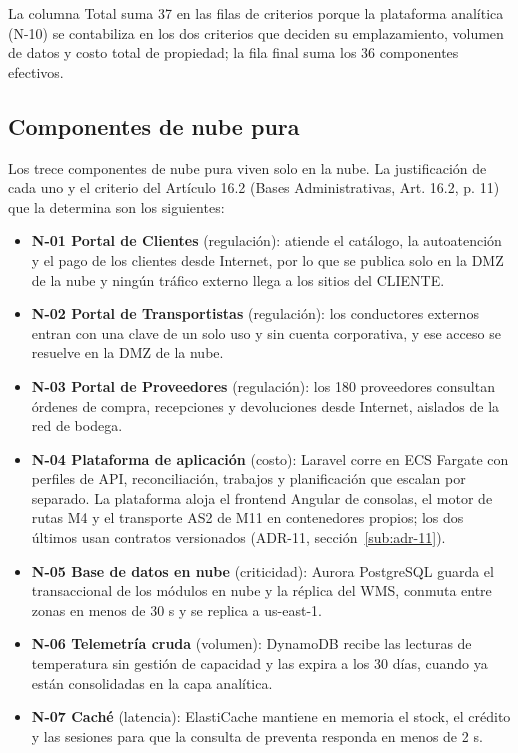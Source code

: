 La columna Total suma 37 en las filas de criterios porque la plataforma analítica (N-10) se contabiliza en los dos criterios que deciden su emplazamiento, volumen de datos y costo total de propiedad; la fila final suma los 36 componentes efectivos.

\subsection{Componentes de nube pura}

Los trece componentes de nube pura viven solo en la nube. La justificación de cada uno y el criterio del Artículo 16.2 (Bases Administrativas, Art. 16.2, p. 11) que la determina son los siguientes:

\begin{itemize}
  \item \textbf{N-01 Portal de Clientes} (regulación): atiende el catálogo, la autoatención y el pago de los clientes desde Internet, por lo que se publica solo en la DMZ de la nube y ningún tráfico externo llega a los sitios del CLIENTE.
  \item \textbf{N-02 Portal de Transportistas} (regulación): los conductores externos entran con una clave de un solo uso y sin cuenta corporativa, y ese acceso se resuelve en la DMZ de la nube.
  \item \textbf{N-03 Portal de Proveedores} (regulación): los 180 proveedores consultan órdenes de compra, recepciones y devoluciones desde Internet, aislados de la red de bodega.
  \item \textbf{N-04 Plataforma de aplicación} (costo): Laravel corre en ECS Fargate con perfiles de API, reconciliación, trabajos y planificación que escalan por separado. La plataforma aloja el frontend Angular de consolas, el motor de rutas M4 y el transporte AS2 de M11 en contenedores propios; los dos últimos usan contratos versionados (ADR-11, sección~\ref{sub:adr-11}).
  \item \textbf{N-05 Base de datos en nube} (criticidad): Aurora PostgreSQL guarda el transaccional de los módulos en nube y la réplica del WMS, conmuta entre zonas en menos de 30 s y se replica a us-east-1.
  \item \textbf{N-06 Telemetría cruda} (volumen): DynamoDB recibe las lecturas de temperatura sin gestión de capacidad y las expira a los 30 días, cuando ya están consolidadas en la capa analítica.
  \item \textbf{N-07 Caché} (latencia): ElastiCache mantiene en memoria el stock, el crédito y las sesiones para que la consulta de preventa responda en menos de 2 s.

\end{itemize}

